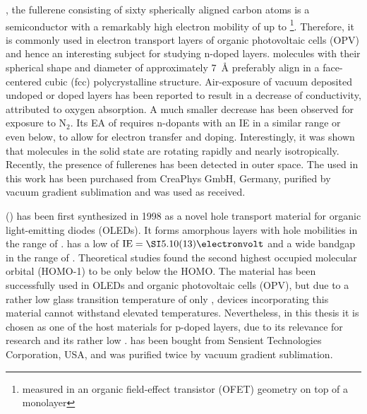 \CS, the fullerene consisting of sixty spherically aligned carbon atoms is a semiconductor with a remarkably high electron mobility of up to \mob[4.9]\cite{Itaka2006}\footnote{measured in an organic field-effect transistor (OFET) geometry on top of a \pen monolayer}. Therefore, it is commonly used in electron transport layers of organic photovoltaic cells (OPV) and hence an interesting subject for studying n-doped layers. \CS molecules with their spherical shape and diameter of approximately \SI{7}{\angstrom} preferably align in a face-centered cubic (fcc) polycrystalline structure\cite{Peimo1993}. Air-exposure of vacuum deposited undoped or doped \CS layers has been reported to result in a decrease of conductivity, attributed to oxygen absorption\cite{Hamed1993,Fujimori1994}. A much smaller decrease has been observed for exposure to N$_2$\cite{Fujimori1994}.
Its \EA EA of \cite{Zhao2009} requires n-dopants with an \IE IE in a similar range or even below, to allow for electron transfer and doping.
Interestingly, it was shown that \CS molecules in the solid state are rotating rapidly and nearly isotropically\cite{Tycko1991}. Recently, the presence of fullerenes has been detected in outer space\cite{Cami2010,Lohrmann1823}.
The \CS used in this work has been purchased from CreaPhys GmbH, Germany, purified by vacuum gradient sublimation and was used as received.

\minisec{\meo} %
\meo (\meoLong) has been first synthesized in 1998\cite{Thelakkat1998} as a novel hole transport material for organic light-emitting diodes (OLEDs). It forms amorphous layers\cite{Pfeiffer2003} with hole mobilities in the range of \mob[2.3E-05]\mphOFET. \meo has a low \IE of \mbox{$\text{IE}=\eV{5.10(13)}$}\cite{Olthof2009,Tietze2012} and a wide bandgap in the range of \Egap[3.2]\cite{He2004a}.
Theoretical studies found the second highest occupied molecular orbital (HOMO-1) to be only  below the HOMO\cite{Matis2010}.
The material has been successfully used in OLEDs\cite{He2004} and organic photovoltaic cells (OPV)\cite{Drechsel2004}, but due to a rather low glass transition temperature of only \Tg[67]\cite{Thelakkat1998}, devices incorporating this material cannot withstand elevated temperatures. Nevertheless, in this thesis it is chosen as one of the host materials for p-doped layers, due to its relevance for research and its rather low \IE.
\meo has been bought from Sensient Technologies Corporation, USA, and was purified twice by vacuum gradient sublimation.

